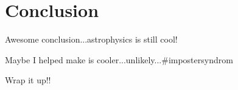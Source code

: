 
\chapter{Conclusion}


Awesome conclusion...astrophysics is still cool!

Maybe I helped make is cooler...unlikely...$\#$impostersyndrom

Wrap it up!!
